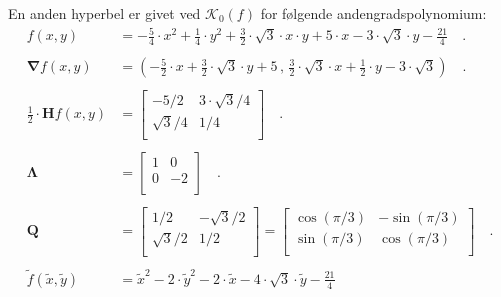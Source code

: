 \begin{example}[Hyperbel] \label{exampHyp01}
En anden hyperbel er givet ved $\mathcal{K}_{0}(f)$ for følgende andengradspolynomium:
\begin{equation}
\begin{aligned}
f(x,y) &= -\frac{5}{4}\cdot x^{2} + \frac{1}{4}\cdot y^{2} + \frac{3}{2}\cdot \sqrt{3}\cdot x \cdot y + 5\cdot x -3\cdot \sqrt{3}\cdot y  -\frac{21}{4} \quad . \\   \\
\bm{\nabla}f(x,y) &= (-\frac{5}{2}\cdot x  + \frac{3}{2}\cdot \sqrt{3}\cdot y + 5\, , \, \frac{3}{2}\cdot \sqrt{3} \cdot x + \frac{1}{2}\cdot y - 3 \cdot \sqrt{3}) \quad . \\   \\
\frac{1}{2}\cdot \mathbf{H}f(x,y) &= \left[
                     \begin{array}{cc}
                       -5/2 & 3\cdot \sqrt{3}/4 \\
                       \sqrt{3}/4 & 1/4 \\
                     \end{array}
                   \right] \quad . \\  \\
\bm{\Lambda} &= \left[
                     \begin{array}{cc}
                       1 & 0 \\
                       0 & -2 \\
                     \end{array}
                   \right] \quad . \\  \\
\mathbf{Q} &= \left[
                     \begin{array}{cc}
                       1/2 & -\sqrt{3}/2 \\
                       \sqrt{3}/2 & 1/2 \\
                     \end{array}
                   \right] = \left[
                     \begin{array}{cc}
                       \cos(\pi/3) & -\sin(\pi/3) \\
                        \sin(\pi/3) &  \cos(\pi/3)\\
                     \end{array}
                   \right] \quad . \\  \\
\widetilde{f}(\widetilde{x}, \widetilde{y}) & =  \widetilde{x}^{2} - 2\cdot \widetilde{y}^{2} - 2 \cdot \widetilde{x} - 4\cdot \sqrt{3}\cdot \widetilde{y} - \frac{21}{4}\\

\end{aligned}
\end{equation}
\end{example}
